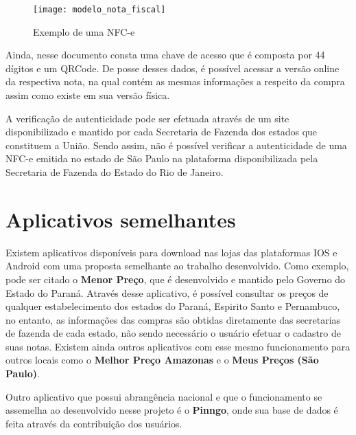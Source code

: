 \begin{figure}[h]
    \centering
    \texttt{[image: modelo\_nota\_fiscal]}
    \caption{Exemplo de uma NFC-e}
    \label{modeloNfce}
\end{figure}

Ainda, nesse documento consta uma chave de acesso que é composta por 44 dígitos e um QRCode. De posse desses dados, é possível acessar a versão online da respectiva nota, na qual contém as mesmas informações a respeito da compra assim como existe em sua versão física.


A verificação de autenticidade pode ser efetuada através de um site disponibilizado e mantido por cada Secretaria de Fazenda dos estados que constituem a União. Sendo assim, não é possível verificar a autenticidade de uma NFC-e emitida no estado de São Paulo na plataforma disponibilizada pela Secretaria de Fazenda do Estado do Rio de Janeiro.

\section{Aplicativos semelhantes}

Existem aplicativos disponíveis para download nas lojas das plataformas IOS e Android com uma proposta semelhante ao trabalho desenvolvido. Como exemplo, pode ser citado o \textbf{Menor Preço}\cite{menorPrecoApp}, que é desenvolvido e mantido pelo Governo do Estado do Paraná. Através desse aplicativo, é possível consultar os preços de qualquer estabelecimento dos estados do Paraná, Espirito Santo e Pernambuco, no entanto, as informações das compras são obtidas diretamente das secretarias de fazenda de cada estado, não sendo necessário o usuário efetuar o cadastro de suas notas. Existem ainda outros aplicativos com esse mesmo funcionamento para outros locais como o \textbf{Melhor Preço Amazonas}\cite{melhorPrecoAmazonasApp} e o \textbf{Meus Preços (São Paulo)}\cite{meusPrecosApp}.

Outro aplicativo que possui abrangência nacional e que o funcionamento se assemelha ao desenvolvido nesse projeto é o \textbf{Pinngo}\cite{pinngoApp}, onde sua base de dados é feita através da contribuição dos usuários.